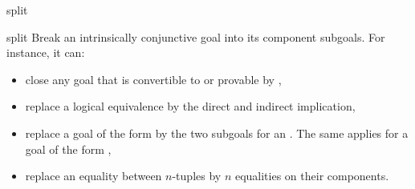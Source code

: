 \begin{tactic}{split}
  \begin{tsyntax}[empty]{split}
  Break an intrinsically conjunctive goal into its component subgoals.
  For instance, it can:
  \begin{itemize}
    \item close any goal that is convertible to  or provable by ,
    \item replace a logical equivalence by the direct and indirect implication,
    \item replace a goal of the form  by the two subgoals for  an
          . The same applies for a goal of the form ,
    \item replace an equality between $n$-tuples by $n$ equalities
          on their components.
  \end{itemize}
  \end{tsyntax}
\end{tactic}
